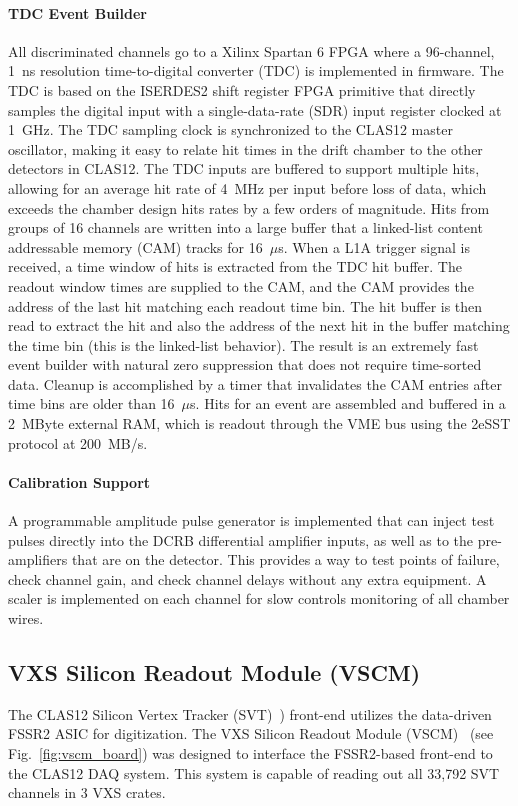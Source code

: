 \paragraph{TDC Event Builder}
All discriminated channels go to a Xilinx Spartan 6 FPGA where a 96-channel, 1~ns resolution time-to-digital converter
(TDC) is implemented in firmware. The TDC is based on the ISERDES2 shift register FPGA primitive that directly
samples the digital input with a single-data-rate (SDR) input register clocked at 1~GHz. The TDC sampling clock is
synchronized to the CLAS12 master oscillator, making it easy to relate hit times in the drift chamber to the other
detectors in CLAS12. The TDC inputs are buffered to support multiple hits, allowing for an average hit rate of 4~MHz
per input before loss of data, which exceeds the chamber design hits rates by a few orders of magnitude. Hits from
groups of 16 channels are written into a large buffer that a linked-list content addressable memory (CAM) tracks for
16~$\mu$s. When a L1A trigger signal is received, a time window of hits is extracted from the TDC hit buffer. The
readout window times are supplied to the CAM, and the CAM provides the address of the last hit matching each readout
time bin. The hit buffer is then read to extract the hit and also the address of the next hit in the buffer matching the
time bin (this is the linked-list behavior). The result is an extremely fast event builder with natural zero suppression that
does not require time-sorted data. Cleanup is accomplished by a timer that invalidates the CAM entries after time bins
are older than 16~$\mu$s. Hits for an event are assembled and buffered in a 2~MByte external RAM, which is readout
through the VME bus using the 2eSST protocol at 200~MB/s.

\paragraph{Calibration Support}
A programmable amplitude pulse generator is implemented that can inject test pulses directly into the DCRB differential
amplifier inputs, as well as to the pre-amplifiers that are on the detector. This provides a way to test points of failure,
check channel gain, and check channel delays without any extra equipment. A scaler is implemented on each channel for
slow controls monitoring of all chamber wires.

\subsection{VXS Silicon Readout Module (VSCM)}
The CLAS12 Silicon Vertex Tracker (SVT)~\cite{svt-ref}) front-end utilizes the data-driven FSSR2 ASIC for
digitization. The VXS Silicon Readout Module (VSCM)~\cite{vscm-ref} (see Fig.~\ref{fig:vscm_board}) was designed to
interface the FSSR2-based front-end to the CLAS12 DAQ system. This system is capable of reading out all 33,792 SVT
channels in 3 VXS crates.


